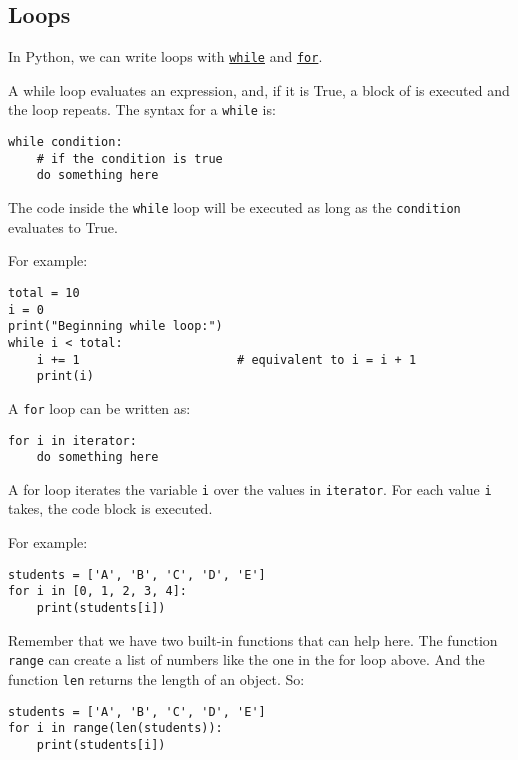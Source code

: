 \documentclass[12pt, a4paper]{article}
\begin{document}
\subsection{Loops}
\label{sec:org8fbfe4c}
In Python, we can write loops with \href{https://docs.python.org/3.6/tutorial/introduction.html\#first-steps-towards-programming}{\texttt{while}} and \href{https://docs.python.org/3.6/tutorial/controlflow.html\#for-statements}{\texttt{for}}.

A while loop evaluates an expression, and, if it is True, a block of is executed and the loop repeats.
The syntax for a \texttt{while} is:
\lstset{language=jupyter-python,label= ,caption= ,captionpos=b,numbers=none}
\begin{lstlisting}
while condition:
    # if the condition is true
    do something here
\end{lstlisting}
The code inside the \texttt{while} loop will be executed as long as the \texttt{condition} evaluates to True.

For example:
\lstset{language=jupyter-python,label= ,caption= ,captionpos=b,numbers=none}
\begin{lstlisting}
total = 10
i = 0
print("Beginning while loop:")
while i < total:
    i += 1                      # equivalent to i = i + 1
    print(i)
\end{lstlisting}

A \texttt{for} loop can be written as:
\lstset{language=jupyter-python,label= ,caption= ,captionpos=b,numbers=none}
\begin{lstlisting}
for i in iterator:
    do something here
\end{lstlisting}
A for loop iterates the variable \texttt{i} over the values in \texttt{iterator}.
For each value \texttt{i} takes, the code block is executed.

For example:
\lstset{language=jupyter-python,label= ,caption= ,captionpos=b,numbers=none}
\begin{lstlisting}
students = ['A', 'B', 'C', 'D', 'E']
for i in [0, 1, 2, 3, 4]:
    print(students[i])
\end{lstlisting}

Remember that we have two built-in functions that can help here. The function \texttt{range} can create a list of numbers like the one in the for loop above. And the function \texttt{len} returns the length of an object.
So:
\lstset{language=jupyter-python,label= ,caption= ,captionpos=b,numbers=none}
\begin{lstlisting}
students = ['A', 'B', 'C', 'D', 'E']
for i in range(len(students)):
    print(students[i])
\end{lstlisting}
\end{document}
